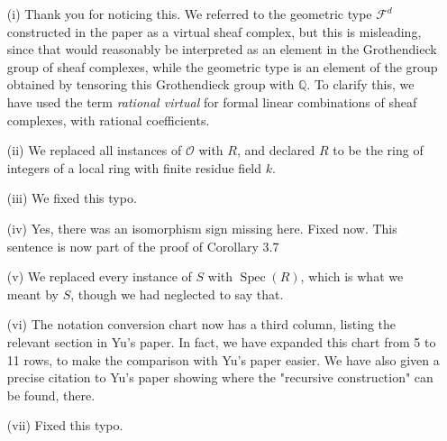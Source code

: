 \documentclass[letter,10pt]{amsart}
\theoremstyle{plain}
\theoremstyle{definition}
\newcommand{\QQ}{{\mathbb{Q}}}
\newcommand{\Spec}[1]{{\operatorname{Spec}(#1)}}
\newcommand{\cs}[1]{{\mathcal{#1}}}
\renewcommand{\O}{{\mathcal{O}}}
\begin{document}
\begin{enumerate}
\item[(i)] Thank you for noticing this. We referred to the geometric type $\cs{F}^d$ constructed in the paper as a virtual sheaf complex, but this is misleading, since that would reasonably be interpreted as an element in the Grothendieck group of sheaf complexes, while the geometric type is an element of the group obtained by tensoring this Grothendieck group with  $\QQ$. To clarify this, we have used the term {\it rational virtual} for formal linear combinations of sheaf complexes, with rational coefficients. 
\item[(ii)] We replaced all instances of $\O$ with $R$, and declared $R$ to be the ring of integers of a local ring with finite residue field $k$. 
\item[(iii)] We fixed this typo.
\item[(iv)] Yes, there was an isomorphism sign missing here. Fixed now. This sentence is now part of the proof of Corollary 3.7
\item[(v)] We replaced every instance of $S$ with $\Spec{R}$, which is what we meant by $S$, though we had neglected to say that.
\item[(vi)]  The notation conversion chart now has a third column, listing the relevant section in Yu's paper. In fact, we have expanded this chart from 5 to 11 rows, to make the comparison with Yu's paper easier. We have also given a precise citation to Yu's paper showing where the "recursive construction" can be found, there.
\item[(vii)] Fixed this typo.
\end{enumerate}
\end{document}
